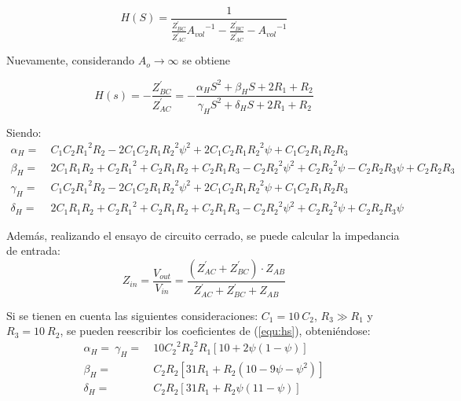 \documentclass[a4paper]{article}
\begin{document}
\begin{equation*}
	H(S) = \frac{1}{\frac{Z_{BC}^{'}}{Z_{AC}^{'}} {A_{vol}}^{-1} - \frac{Z_{BC}^{'}}{Z_{AC}^{'}} - {A_{vol}}^{-1}}
	\label{equ:hsavol}
\end{equation*}

Nuevamente, considerando $A_o \rightarrow \infty$ se obtiene

\begin{equation}
	H(s) = -\frac{Z_{BC}^{'}}{Z_{AC}^{'}} = - \frac{\alpha_H S^{2} + \beta_H S + 2 R_{1} + R_{2}}
	{\gamma_H S^{2} + \delta_H S + 2 R_{1} + R_{2}}
	\label{equ:hs}
\end{equation}

Siendo: 
\begin{equation}
\begin{split}
	\alpha_H =\ & C_{1} C_{2} {R_{1}}^{2} R_{2} - 2 C_{1} C_{2} R_{1} {R_{2}}^{2} \psi^{2} + 2 C_{1} C_{2} R_{1} {R_{2}}^{2} \psi + C_{1} C_{2} R_{1} R_{2} R_{3}\\
	\beta_H =\ & 2 C_{1} R_{1} R_{2} + C_{2} {R_{1}}^{2} + C_{2} R_{1} R_{2} + C_{2} R_{1} R_{3} - C_{2} {R_{2}}^{2} \psi^{2} + C_{2} {R_{2}}^{2} \psi - C_{2} R_{2} R_{3} \psi + C_{2} R_{2} R_{3}\\
	\gamma_H =\ & C_{1} C_{2} {R_{1}}^{2} R_{2} - 2 C_{1} C_{2} R_{1} {R_{2}}^{2} \psi^{2} + 2 C_{1} C_{2} R_{1} {R_{2}}^{2} \psi + C_{1} C_{2} R_{1} R_{2} R_{3}\\
	\delta_H =\ & 2 C_{1} R_{1} R_{2} + C_{2} {R_{1}}^{2} + C_{2} R_{1} R_{2} + C_{2} R_{1} R_{3} - C_{2} {R_{2}}^{2} \psi^{2} + C_{2} {R_{2}}^{2} \psi + C_{2} R_{2} R_{3} \psi
\end{split}
\label{equ:general}
\end{equation}

Además, realizando el ensayo de circuito cerrado, se puede calcular la impedancia de entrada:
\begin{equation}
	Z_{in} = \frac{V_{out}}{V_{in}} = \frac{\left( Z_{AC}^{'} + Z_{BC}^{'} \right) \cdot Z_{AB}}{Z_{AC}^{'} + Z_{BC}^{'} + Z_{AB}}
	\label{equ:zin}
\end{equation}

Si se tienen en cuenta las siguientes consideraciones: $C_1 = 10 \ C_2$, $R_3 \gg R_1$ y $R_3 = 10 \ R_2$, se pueden reescribir los coeficientes de (\ref{equ:hs}), obteniéndose: 
\begin{equation}
\begin{split}
	\alpha_H =\ \gamma_H =\ & 10 {C_{2}}^{2} {R_{2}}^{2} R_{1} \left[ 10 + 2 \psi \left(1 - \psi \right) \right] \\
	\beta_H =\ & C_{2} R_{2} \left[ 31 R_1 + R_2 \left(10 - 9 \psi - \psi^2 \right) \right] \\
	\delta_H =\ & C_{2} R_{2} \left[ 31 R_1 + R_2 \psi \left(11 - \psi \right) \right] \\
\end{split}
\label{equ:simplifica}
\end{equation}
\end{document}
